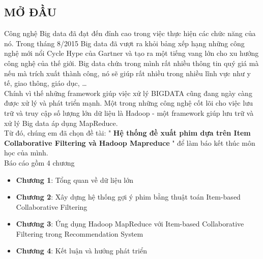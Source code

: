 \documentclass{report}
\begin{document}
\newpage
\begin{center}
    \section*{MỞ ĐẦU}
\end{center}
\begin{flushleft}
    \vspace{1cm}
    Công nghệ Big data đã đạt đến đỉnh cao trong việc thực hiện các chức năng
    của nó. Trong tháng 8/2015 Big data đã vượt ra khỏi bảng xếp hạng những
    công nghệ mới nổi Cycle Hype của Gartner và tạo ra một tiếng vang lớn cho xu
    hướng công nghệ của thế giới. Big data chứa trong mình rất nhiều thông tin
    quý giá mà nếu mà trích xuất thành công, nó sẽ giúp rất nhiều trong nhiều
    lĩnh vực như y tế, giao thông, giáo dục, …\\
    \vspace{0.5cm}
    Chính vì thế những framework giúp việc xử lý BIGDATA cũng đang ngày càng
    được xử lý và phát triển mạnh. Một trong những công nghệ cốt lõi cho việc
    lưu trữ và truy cập số lượng lớn dữ liệu là Hadoop - một framework giúp lưu
    trữ và xử lý Big data áp dụng MapReduce.\\
    \vspace{0.5cm}
    Từ đó, chúng em đã chọn đề tài: " \textbf{Hệ thống đề xuất phim dựa trên Item
        Collaborative Filtering và Hadoop Mapreduce} " để làm báo kết thúc môn học
    của mình.\\
    \vspace{0.5cm}
    Báo cáo gồm 4 chương
    \begin{itemize}
        \item \textbf{Chương 1}: Tổng quan về dữ liệu lớn
        \item \textbf{Chương 2}: Xây dựng hệ thống gợi ý phim bằng thuật toán
              Item-based Collaborative Filtering
        \item \textbf{Chương 3}: Ứng dụng Hadoop MapReduce với Item-based
              Collaborative Filtering trong Recommendation System
        \item \textbf{Chương 4}: Kết luận và hướng phát triển
    \end{itemize}

\end{flushleft}

\tableofcontents
\setcounter{page}{2}

\end{document}
